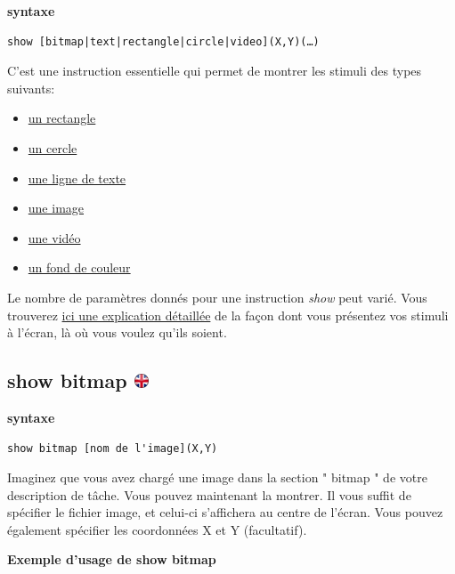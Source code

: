 \documentclass[
]{book}
\providecommand{\tightlist}{%
  \setlength{\itemsep}{0pt}\setlength{\parskip}{0pt}}
\begin{document}
\textbf{syntaxe}

\begin{verbatim}
show [bitmap|text|rectangle|circle|video](X,Y)(…)
\end{verbatim}

C'est une instruction essentielle qui permet de montrer les stimuli des types suivants:

\begin{itemize}
\tightlist
\item
  \protect\hyperlink{task-show-rectangle}{un rectangle}
\item
  \protect\hyperlink{task-show-circle}{un cercle}
\item
  \protect\hyperlink{task-show-text}{une ligne de texte}
\item
  \protect\hyperlink{task-show-bitmap}{une image}
\item
  \protect\hyperlink{task-show-video}{une vidéo}
\item
  \protect\hyperlink{task-show-background}{un fond de couleur}
\end{itemize}

Le nombre de paramètres donnés pour une instruction \emph{show} peut varié. Vous trouverez \protect\hyperlink{s4-2}{ici une explication détaillée} de la façon dont vous présentez vos stimuli à l'écran, là où vous voulez qu'ils soient.

\hypertarget{show-bitmap}{%
\subsection[show bitmap ]{\texorpdfstring{show bitmap \href{https://www.psytoolkit.org/doc3.4.0/syntax.html\#task-show-bitmap}{\protect\includegraphics{img/ukflag.png}}}{show bitmap }}\label{show-bitmap}}

\textbf{syntaxe}

\begin{verbatim}
show bitmap [nom de l'image](X,Y)
\end{verbatim}

Imaginez que vous avez chargé une image dans la section " bitmap " de votre description de tâche. Vous pouvez maintenant la montrer. Il vous suffit de spécifier le fichier image, et celui-ci s'affichera au centre de l'écran. Vous pouvez également spécifier les coordonnées X et Y (facultatif).

\textbf{Exemple d'usage de show bitmap}
\end{document}
